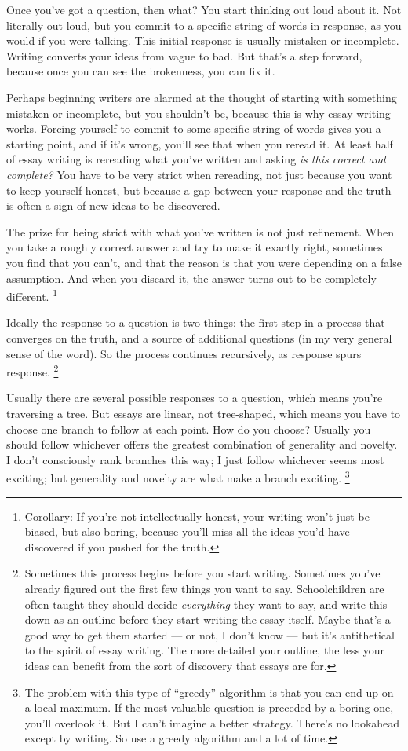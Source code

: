 Once you've got a question, then what? You start thinking out loud about
it. Not literally out loud, but you commit to a specific string of words
in response, as you would if you were talking. This initial response is
usually mistaken or incomplete. Writing converts your ideas from vague
to bad. But that's a step forward, because once you can see the
brokenness, you can fix it.

Perhaps beginning writers are alarmed at the thought of starting with
something mistaken or incomplete, but you shouldn't be, because this is
why essay writing works. Forcing yourself to commit to some specific
string of words gives you a starting point, and if it's wrong, you'll
see that when you reread it. At least half of essay writing is rereading
what you've written and asking \emph{is this correct and complete?} You
have to be very strict when rereading, not just because you want to keep
yourself honest, but because a gap between your response and the truth
is often a sign of new ideas to be discovered.

The prize for being strict with what you've written is not just
refinement. When you take a roughly correct answer and try to make it
exactly right, sometimes you find that you can't, and that the reason is
that you were depending on a false assumption. And when you discard it,
the answer turns out to be completely different. \footnote{Corollary: If you're not intellectually honest, your writing
won't just be biased, but also boring, because you'll miss all the ideas
you'd have discovered if you pushed for the truth.}

Ideally the response to a question is two things: the first step in a
process that converges on the truth, and a source of additional
questions (in my very general sense of the word). So the process
continues recursively, as response spurs response.
\footnote{Sometimes this process begins before you start writing.
Sometimes you've already figured out the first few things you want to
say. Schoolchildren are often taught they should decide
\emph{everything} they want to say, and write this down as an outline
before they start writing the essay itself. Maybe that's a good way to
get them started --- or not, I don't know --- but it's antithetical to
the spirit of essay writing. The more detailed your outline, the less
your ideas can benefit from the sort of discovery that essays are for.}

Usually there are several possible responses to a question, which means
you're traversing a tree. But essays are linear, not tree-shaped, which
means you have to choose one branch to follow at each point. How do you
choose? Usually you should follow whichever offers the greatest
combination of generality and novelty. I don't consciously rank branches
this way; I just follow whichever seems most exciting; but generality
and novelty are what make a branch exciting. \footnote{The problem with this type of ``greedy'' algorithm is that you
can end up on a local maximum. If the most valuable question is preceded
by a boring one, you'll overlook it. But I can't imagine a better
strategy. There's no lookahead except by writing. So use a greedy
algorithm and a lot of time.}

